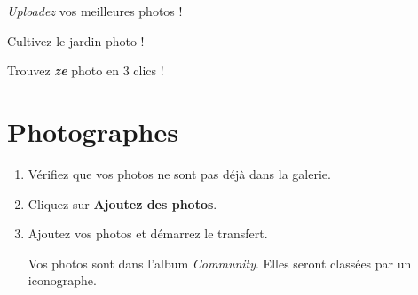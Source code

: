 \documentclass[12pt,nofoldmark,notumble]{leaflet}
\begin{document}
\begin{description}[align=right,labelwidth=2.3cm]
\item [Photographes] \emph{Uploadez} vos meilleures photos !
\item [Iconographes] Cultivez le jardin photo !
\item [Graphistes] Trouvez \textbf{\textit{ze}} photo en 3 clics !
\end{description}

\clearpage
\section{\faCamera Photographes}

\vspace*{\fill}

\begin{enumerate}[itemsep=0mm,leftmargin=*]

\item Vérifiez que vos photos ne sont pas déjà dans la galerie.
\item Cliquez sur \textbf{Ajoutez des photos}.
  \end{enumerate}
\begin{center}
\setlength{\fboxsep}{0pt}%
\setlength{\fboxrule}{0pt}%
%
\end{center}
  \begin{enumerate}
  \setcounter{enumi}{2}
\item Ajoutez vos photos et démarrez le transfert.

  Vos photos sont dans l'album \emph{Community}. Elles seront classées par un iconographe.
  
\end{enumerate}
\end{document}
